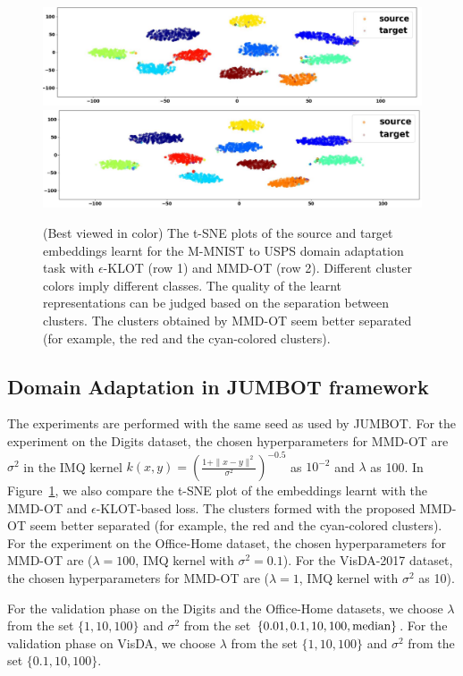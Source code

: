 \begin{figure}[t]
\centering
\includegraphics[width=0.6\linewidth]{chapter-1/images/KL-tsne.pdf}\\
\includegraphics[width=0.6\linewidth]{chapter-1/images/MMDOT-tsne.pdf}
\caption{(Best viewed in color) The t-SNE plots of the source and target embeddings learnt for the M-MNIST to USPS domain adaptation task with $\epsilon$-KLOT (row 1) and MMD-OT (row 2). Different cluster colors imply different classes. The quality of the learnt representations can be judged based on the separation between clusters. The clusters obtained by MMD-OT seem better separated (for example, the red and the cyan-colored clusters).}
\label{tsne}
\end{figure}

\subsection{Domain Adaptation in JUMBOT framework}\label{app:jumbot} The experiments are performed with the same seed as used by JUMBOT. For the experiment on the Digits dataset, the chosen hyperparameters for MMD-OT are $\sigma^2$ in the IMQ kernel $k(x, y) = \left(\frac{1+\|x-y\|^2}{\sigma^2}\right)^{-0.5}$ as $10^{-2}$ and $\lambda$ as 100. In Figure~\ref{tsne}, we also compare the t-SNE plot of the embeddings learnt with the MMD-OT and $\epsilon$-KLOT-based loss. The clusters formed with the proposed MMD-OT seem better separated (for example, the red and the cyan-colored clusters).
For the experiment on the Office-Home dataset, the chosen hyperparameters for MMD-OT are \Big($\lambda=100$, IMQ kernel with $\sigma^2=0.1$\Big). For the VisDA-2017 dataset, the chosen hyperparameters for MMD-OT are \Big($\lambda=1$, IMQ kernel with $\sigma^2$ as 10\Big).

For the validation phase on the Digits and the Office-Home datasets, we choose $\lambda$ from the set $\{1, 10, 100\}$ and $\sigma^2$ from the set $\{0.01, 0.1, 10, 100, \textup{median}\}$. For the validation phase on VisDA, we choose $\lambda$ from the set $\{1, 10, 100\}$ and $\sigma^2$ from the set $\{0.1, 10, 100\}$. 

